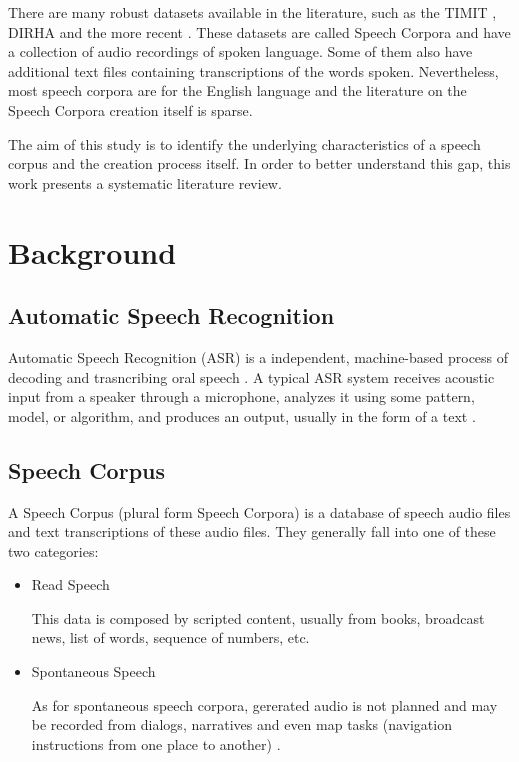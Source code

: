 \documentclass[conference]{IEEEtran}
\begin{document}
There are many robust datasets available in the literature, such as the TIMIT \cite{Lamel1992timmit}, DIRHA \cite{Ravanelli2016dirha} and the more recent \cite{chanchaochai2018globaltimit}. These datasets are called Speech Corpora and have a collection of audio recordings of spoken language. Some of them also have additional text files containing transcriptions of the words spoken. Nevertheless, most speech corpora are for the English language \cite{LeRouxVincent2014TRdatasets} and the literature on the Speech Corpora creation itself is sparse. 

The aim of this study is to identify the underlying characteristics of a speech corpus and the creation process itself. In order to better understand this gap, this work presents a systematic literature review. 

\section{Background}

\subsection{Automatic Speech Recognition}

Automatic Speech Recognition (ASR) is a independent, machine-based process of decoding and trasncribing oral speech \cite{asr2012levis}. A typical ASR system receives acoustic input from a speaker through a microphone, analyzes it using some pattern, model, or algorithm, and produces an output, usually in the  form of a text \cite{lai2008conversational}.

\subsection{Speech Corpus}

A Speech Corpus (plural form Speech Corpora) is a database of speech audio files and text transcriptions of these audio files. They generally fall into one of these two categories:

\begin{itemize}
    \item Read Speech
    
    This data is composed by scripted content, usually from books, broadcast news, list of words, sequence of numbers, etc. 

    \item Spontaneous Speech
    
    As for spontaneous speech corpora, gererated audio is not planned and may be recorded from dialogs, narratives \cite{ruhlemann2012introducing} and even map tasks (navigation instructions from one place to another) \cite{thompson1993hcrc}.
\end{itemize}
\end{document}

